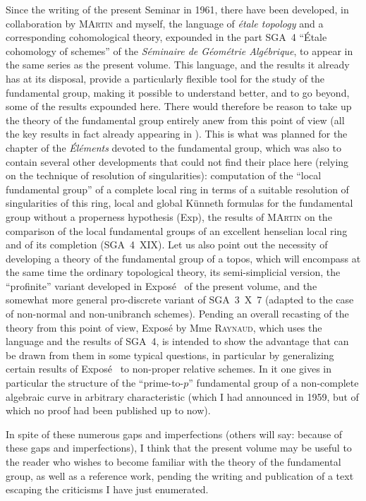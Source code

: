 Since the writing of the present Seminar in 1961, there have been
developed, in collaboration by M\ptbl \textsc{Artin} and myself, the
language of \emph{\'etale topology} and a corresponding cohomological
theory, expounded in the part SGA~4 ``\'Etale cohomology of schemes'' of
the \emph{S\'eminaire de G\'eom\'etrie Alg\'ebrique}, to appear in the
same series as the present volume. This language, and the results it
already has at its disposal, provide a particularly flexible tool for the
study of the fundamental group, making it possible to understand better,
and to go beyond, some of the results expounded here. There would
therefore be reason to take up the theory of the fundamental group
entirely anew from this point of view (all the key results in fact
already appearing in \loccit). This is what was planned for the chapter
of the \emph{\'El\'ements} devoted to the fundamental group, which was
also to contain several other developments that could not find their
place here (relying on the technique of resolution of singularities):
computation of the ``local fundamental group'' of a complete local ring
in terms of a suitable resolution of singularities of this ring, local
and global K\"unneth formulas for the fundamental group without a
properness hypothesis (\cf Exp\ptbl {}), the results of
M\ptbl \textsc{Artin} on the comparison of the local fundamental groups
of an excellent henselian local ring and of its completion
(SGA~4~XIX). Let us also point out the necessity of developing a theory
of the fundamental group of a topos, which will encompass at the same
time the ordinary topological theory, its semi-simplicial version, the
``profinite'' variant developed in Expos\'e~ of the present volume,
and the somewhat more general pro-discrete variant of SGA~3~X~7 (adapted
to the case of non-normal and non-unibranch schemes). Pending an overall
recasting of the theory from this point of view, Expos\'e  by
Mme \textsc{Raynaud}, which uses the language and the results of SGA~4,
is intended to show the advantage that can be drawn from them in some
typical questions, in particular by generalizing certain results of
Expos\'e~ to non-proper relative schemes. In it one gives in
particular the structure of the ``prime-to-$p$'' fundamental group of a
non-complete algebraic curve in arbitrary characteristic (which I had
announced in 1959, but of which no proof had been published up to now).

In spite of these numerous gaps and imperfections (others will say:
because of these gaps and imperfections), I think that the present
volume may be useful to the reader who wishes to become familiar with
the theory of the fundamental group, as well as a reference work,
pending the writing and publication of a text escaping the criticisms I
have just enumerated.

